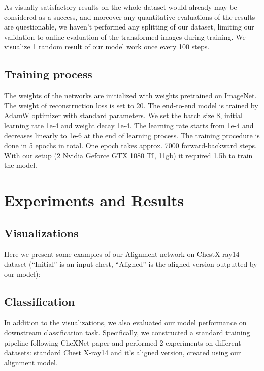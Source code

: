 \documentclass{article}
\begin{document}
As visually satisfactory results on the whole dataset would already may be 
considered as a success, and moreover any quantitative evaluations of the 
results are questionable, we haven't performed any splitting of our dataset, 
limiting our validation to online evaluation of the transformed images during 
training. We visualize 1 random result of our model work once every 100 steps.

\subsection{Training process}
The weights of the networks are initialized with weights pretrained on ImageNet. 
The weight of reconstruction loss is set to 20. The end-to-end model is trained 
by AdamW optimizer with standard parameters. We set the batch size 8, initial 
learning rate 1e-4 and weight decay 1e-4. The learning rate starts from 1e-4 
and decreases linearly to 1e-6 at the end of learning process. The training 
procedure is done in 5 epochs in total. One epoch takes approx. 7000 
forward-backward steps. With our setup (2 Nvidia Geforce GTX 1080 TI, 11gb) it 
required 1.5h to train the model.

\section{Experiments and Results}\label{experiments_and_results}

\subsection{Visualizations}

Here we present some examples of our Alignment network on ChestX-ray14 dataset 
 (``Initial'' is an input chest, ``Aligned'' is the aligned version outputted by our model):

\subsection{Classification}


In addition to the visualizations, we also evaluated our model performance 
on downstream \href{https://paperswithcode.com/sota/multi-label-classification-on-chestx-ray14}{classification task}. 
Specifically, we constructed a standard training pipeline following CheXNet 
paper and performed 2 experiments on different datasets: standard Chest X-ray14 
and it's aligned version, created using our alignment model.
\end{document}
